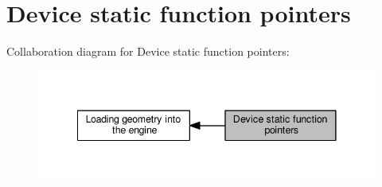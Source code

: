 \hypertarget{group__device__pointers}{}\section{Device static function pointers}
\label{group__device__pointers}
Collaboration diagram for Device static function pointers\+:
\nopagebreak
\begin{figure}[H]
\begin{center}
\leavevmode
\includegraphics[width=341pt]{group__device__pointers}
\end{center}
\end{figure}
